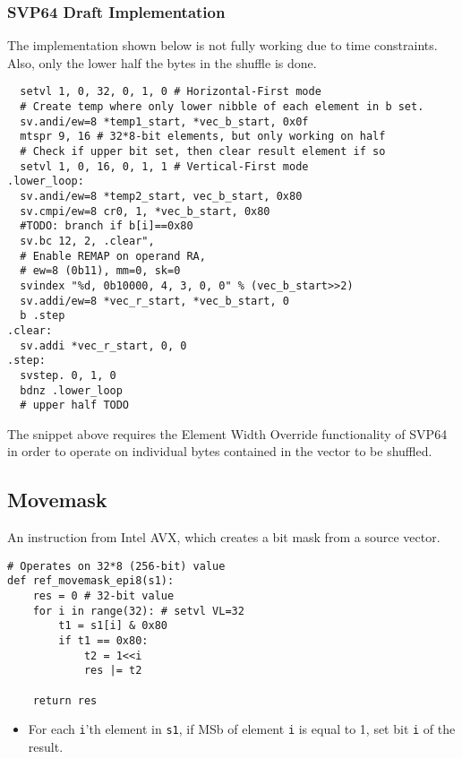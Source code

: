 \subsubsection{\acrshort{SVP64} Draft Implementation}

The implementation shown below is not fully working due to time constraints.
Also, only the lower half the bytes in the shuffle is done.

\begin{verbatim}
  setvl 1, 0, 32, 0, 1, 0 # Horizontal-First mode
  # Create temp where only lower nibble of each element in b set.
  sv.andi/ew=8 *temp1_start, *vec_b_start, 0x0f
  mtspr 9, 16 # 32*8-bit elements, but only working on half
  # Check if upper bit set, then clear result element if so
  setvl 1, 0, 16, 0, 1, 1 # Vertical-First mode
.lower_loop:
  sv.andi/ew=8 *temp2_start, vec_b_start, 0x80
  sv.cmpi/ew=8 cr0, 1, *vec_b_start, 0x80
  #TODO: branch if b[i]==0x80
  sv.bc 12, 2, .clear",
  # Enable REMAP on operand RA,
  # ew=8 (0b11), mm=0, sk=0
  svindex "%d, 0b10000, 4, 3, 0, 0" % (vec_b_start>>2)
  sv.addi/ew=8 *vec_r_start, *vec_b_start, 0
  b .step
.clear:
  sv.addi *vec_r_start, 0, 0
.step:
  svstep. 0, 1, 0
  bdnz .lower_loop
  # upper half TODO
\end{verbatim}

The snippet above requires the Element Width Override functionality of
\acrshort{SVP64} in order to operate on individual bytes contained
in the vector to be shuffled.

\subsection{Movemask}

An instruction from Intel \acrshort{AVX}, which creates a bit mask from a
source vector.

\begin{verbatim}
# Operates on 32*8 (256-bit) value
def ref_movemask_epi8(s1):
    res = 0 # 32-bit value
    for i in range(32): # setvl VL=32
        t1 = s1[i] & 0x80
        if t1 == 0x80:
            t2 = 1<<i
            res |= t2

    return res
\end{verbatim}

\begin{itemize}
  \item For each \texttt{i}'th element in \texttt{s1}, if \acrshort{MSb} of
        element \texttt{i} is equal to 1, set bit \texttt{i} of the result.
\end{itemize}

